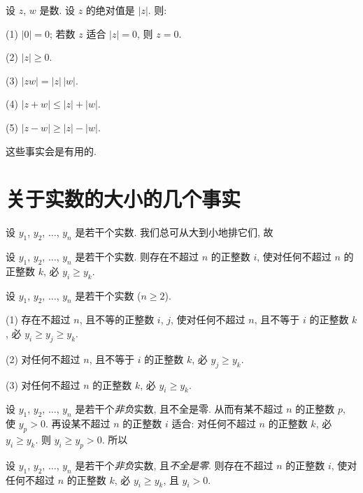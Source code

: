 设 \(z\), \(w\) 是数.
设 \(z\) 的绝对值是 \(|z|\).
则:

(1)
\(|0| = 0\);
若数 \(z\) 适合 \(|z| = 0\), 则 \(z = 0\).

(2)
\(|z| \geq 0\).

(3)
\(|zw| = |z|\, |w|\).

(4)
\(|{z + w}| \leq |z| + |w|\).

(5)
\(|{z - w}| \geq |z| - |w|\).

\vspace{2ex}

这些事实会是有用的.

\section{关于实数的大小的几个事实}

设 \(y_1\), \(y_2\), \(\dots\), \(y_n\) 是若干个实数.
我们总可从大到小地排它们,
故

\begin{theorem}
    设 \(y_1\), \(y_2\), \(\dots\), \(y_n\) 是若干个实数.
    则存在不超过 \(n\) 的正整数 \(i\),
    使对任何不超过 \(n\) 的正整数 \(k\),
    必 \(y_i \geq y_k\).
\end{theorem}

\begin{theorem}
    设 \(y_1\), \(y_2\), \(\dots\), \(y_n\) 是若干个实数
    (\(n \geq 2\)).

    (1)
    存在不超过 \(n\), 且不等的正整数 \(i\), \(j\),
    使对任何不超过 \(n\), 且不等于 \(i\) 的正整数 \(k\),
    必 \(y_i \geq y_j \geq y_k\).

    (2)
    对任何不超过 \(n\), 且不等于 \(i\) 的正整数 \(k\),
    必 \(y_j \geq y_k\).

    (3)
    对任何不超过 \(n\) 的正整数 \(k\),
    必 \(y_i \geq y_k\).
\end{theorem}

设 \(y_1\), \(y_2\), \(\dots\), \(y_n\) 是若干个\emph{非负}实数,
且不全是零.
从而有某不超过 \(n\) 的正整数 \(p\), 使 \(y_p > 0\).
再设某不超过 \(n\) 的正整数 \(i\) 适合:
对任何不超过 \(n\) 的正整数 \(k\),
必 \(y_i \geq y_k\).
则 \(y_i \geq y_p > 0\).
所以

\begin{theorem}
    设 \(y_1\), \(y_2\), \(\dots\), \(y_n\) 是若干个\emph{非负}实数,
    且\emph{不全是零}.
    则存在不超过 \(n\) 的正整数 \(i\),
    使对任何不超过 \(n\) 的正整数 \(k\),
    必 \(y_i \geq y_k\),
    且 \(y_i > 0\).
\end{theorem}

